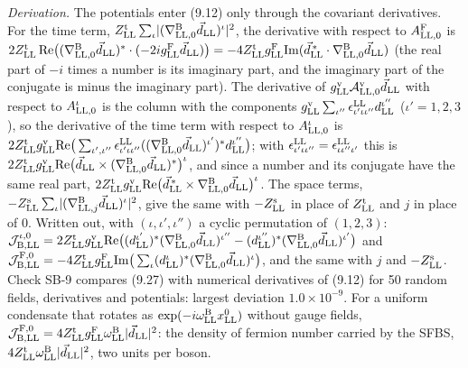 \documentclass[
  10pt,
]{article}
\begin{document}
\emph{Derivation.} The potentials enter (9.12) only through the
covariant derivatives. For the time term,
\(Z^{\rm t}_{\rm LL}\sum_\iota\lvert(\nabla^{\rm B}_{{\rm LL},0}\vec d_{\rm LL})^\iota\rvert^2\),
the derivative with respect to \(A^{\rm F}_{{\rm LL},0}\) is
\(2Z^{\rm t}_{\rm LL}\,{\rm Re}\big((\nabla^{\rm B}_{{\rm LL},0}\vec d_{\rm LL})^*\cdot(-2ig^{\rm F}_{\rm LL}\vec d_{\rm LL})\big)=-4Z^{\rm t}_{\rm LL}g^{\rm F}_{\rm LL}{\rm Im}(\vec d^{\,*}_{\rm LL}\cdot\nabla^{\rm B}_{{\rm LL},0}\vec d_{\rm LL})\)
(the real part of \(-i\) times a number is its imaginary part, and the
imaginary part of the conjugate is minus the imaginary part). The
derivative of
\(g^{\rm v}_{\rm LL}\mathcal A^{\rm v}_{{\rm LL},0}\vec d_{\rm LL}\)
with respect to \(A^\iota_{{\rm LL},0}\) is the column with the
components
\(g^{\rm v}_{\rm LL}\sum_{\iota''}\epsilon^{\rm LL}_{\iota'\iota\iota''}d^{\iota''}_{\rm LL}\)
(\(\iota'=1,2,3\)), so the derivative of the time term with respect to
\(A^\iota_{{\rm LL},0}\) is
\(2Z^{\rm t}_{\rm LL}g^{\rm v}_{\rm LL}{\rm Re}\big(\sum_{\iota',\iota''}\epsilon^{\rm LL}_{\iota'\iota\iota''}((\nabla^{\rm B}_{{\rm LL},0}\vec d_{\rm LL})^{\iota'})^*d^{\iota''}_{\rm LL}\big)\);
with
\(\epsilon^{\rm LL}_{\iota'\iota\iota''}=\epsilon^{\rm LL}_{\iota\iota''\iota'}\)
this is
\(2Z^{\rm t}_{\rm LL}g^{\rm v}_{\rm LL}{\rm Re}\big(\vec d_{\rm LL}\times(\nabla^{\rm B}_{{\rm LL},0}\vec d_{\rm LL})^*\big)^\iota\),
and since a number and its conjugate have the same real part,
\(2Z^{\rm t}_{\rm LL}g^{\rm v}_{\rm LL}{\rm Re}\big(\vec d^{\,*}_{\rm LL}\times\nabla^{\rm B}_{{\rm LL},0}\vec d_{\rm LL}\big)^\iota\).
The space terms,
\(-Z^{\rm s}_{\rm LL}\sum_\iota\lvert(\nabla^{\rm B}_{{\rm LL},j}\vec d_{\rm LL})^\iota\rvert^2\),
give the same with \(-Z^{\rm s}_{\rm LL}\) in place of
\(Z^{\rm t}_{\rm LL}\) and \(j\) in place of 0. Written out, with
\((\iota,\iota',\iota'')\) a cyclic permutation of \((1,2,3)\):
\(\mathcal J^{\iota,0}_{{\rm B},{\rm LL}}=2Z^{\rm t}_{\rm LL}g^{\rm v}_{\rm LL}{\rm Re}\big((d^{\iota'}_{\rm LL})^*(\nabla^{\rm B}_{{\rm LL},0}\vec d_{\rm LL})^{\iota''}-(d^{\iota''}_{\rm LL})^*(\nabla^{\rm B}_{{\rm LL},0}\vec d_{\rm LL})^{\iota'}\big)\)
and
\(\mathcal J^{{\rm F},0}_{{\rm B},{\rm LL}}=-4Z^{\rm t}_{\rm LL}g^{\rm F}_{\rm LL}{\rm Im}\big(\sum_\iota(d^\iota_{\rm LL})^*(\nabla^{\rm B}_{{\rm LL},0}\vec d_{\rm LL})^\iota\big)\),
and the same with \(j\) and \(-Z^{\rm s}_{\rm LL}\). Check SB-9 compares
(9.27) with numerical derivatives of (9.12) for 50 random fields,
derivatives and potentials: largest deviation \(1.0\times10^{-9}\). For
a uniform condensate that rotates as
\(\exp(-i\omega^{\rm B}_{\rm LL}x^0_{\rm LL})\) without gauge fields,
\(\mathcal J^{{\rm F},0}_{{\rm B},{\rm LL}}=4Z^{\rm t}_{\rm LL}g^{\rm F}_{\rm LL}\omega^{\rm B}_{\rm LL}\lvert\vec d_{\rm LL}\rvert^2\):
the density of fermion number carried by the SFBS,
\(4Z^{\rm t}_{\rm LL}\omega^{\rm B}_{\rm LL}\lvert\vec d_{\rm LL}\rvert^2\),
two units per boson.
\end{document}
